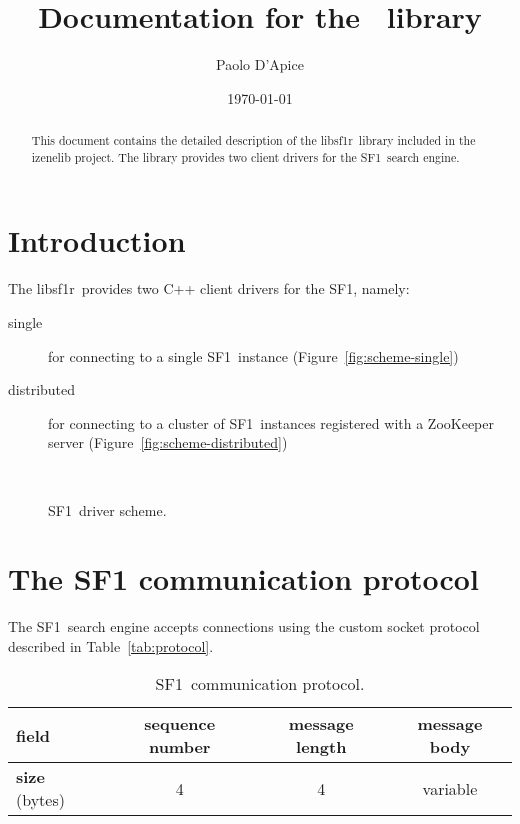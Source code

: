 \documentclass[a4paper,10pt]{article}
\title{Documentation for the \libsf\ library}
\author{Paolo D'Apice}
\date{\today}
\newcommand{\libsf}{\textsf{libsf1r}}
\newcommand{\sfr}{\textsf{SF1}}
\begin{document}
\lstset{basicstyle=\sffamily}

\maketitle

\begin{abstract}
This document contains the detailed description of the \libsf\ library 
included in the izenelib project. The library provides two client drivers
for the \sfr\ search engine.
\end{abstract}

\tableofcontents

\section{Introduction}

The \libsf\ provides two C++ client drivers for the \sfr, namely:
\begin{description}
 \item[single] for connecting to a single \sfr\ instance (Figure~\vref{fig:scheme-single})
 \item[distributed] for connecting to a cluster of \sfr\ instances
                    registered with a ZooKeeper server (Figure~\vref{fig:scheme-distributed})
\end{description}

\begin{figure}
 \centering
  \\
 \caption{\sfr\ driver scheme.}
\end{figure}

\section{The SF1 communication protocol}

The \sfr\ search engine accepts connections using the custom socket protocol
described in Table~\vref{tab:protocol}.

\begin{table}[p]
 \centering
 \caption{\sfr\ communication protocol.}
 \label{tab:protocol}
 \begin{tabular}{lccc}
 \toprule
 \textbf{field} & sequence number & message length & message body\\
 \midrule
 \textbf{size} (bytes) & 4 & 4 & variable \\
 \bottomrule
 \end{tabular}
\end{table}
\end{document}
